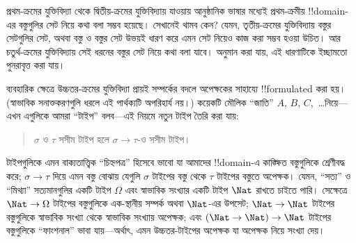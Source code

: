\documentclass[../../../include/open-logic-section]{subfiles}
\begin{document}


প্রথম-ক্রমের যুক্তিবিদ্যা থেকে দ্বিতীয়-ক্রমের যুক্তিবিদ্যায় যাওয়ায়
আনুষ্ঠানিক ভাষার মধ্যেই প্রথম-ক্রমীয় !!{domain}-এর বস্তুগুলির সেট নিয়ে
কথা বলা সম্ভব হয়েছে। সেখানেই থামব কেন? যেমন, তৃতীয়-ক্রমের
যুক্তিবিদ্যায় বস্তুর সেটগুলির সেট, অথবা বস্তু ও বস্তুর সেট উভয়ই ধারণ
করে এমন সেট নিয়েও কাজ করা সম্ভব হওয়া উচিত। আর চতুর্থ-ক্রমের
যুক্তিবিদ্যায় সেই ধরনের বস্তুর সেট নিয়ে কথা বলা যাবে। অনুমান করা যায়,
এই ধারণাটিকে ইচ্ছামতো পুনরাবৃত্ত করা যায়।

ব্যবহারিক ক্ষেত্রে উচ্চতর-ক্রমের যুক্তিবিদ্যা প্রায়ই সম্পর্কের বদলে
অপেক্ষকের সাহায্যে !!{formula}ted করা হয়। (স্বাভাবিক সনাক্তকরণগুলি
ধরলে এই পার্থক্যটি অপরিহার্য নয়।) কয়েকটি মৌলিক “জাতি” $A$, $B$,
$C$,~\dots নিয়ে---এখন এগুলিকে আমরা “টাইপ” বলব---এই নিয়মে নতুন টাইপ
তৈরি করা যায়:
\begin{quote}
$\sigma$ ও $\tau$ সসীম টাইপ হলে $\sigma \to \tau$-ও সসীম টাইপ।
\end{quote}
টাইপগুলিকে এমন বাক্যতাত্ত্বিক “চিহ্নপত্র” হিসেবে ভাবো যা আমাদের
!!{domain}-এ কাঙ্ক্ষিত বস্তুগুলিকে শ্রেণীবদ্ধ করে; $\sigma \to \tau$
দিয়ে এমন বস্তু বোঝায় যেগুলি $\sigma$ টাইপের বস্তু থেকে $\tau$ টাইপের
বস্তুতে অপেক্ষক। যেমন, “সত্য” ও “মিথ্যা” সত্যমানগুলির একটি টাইপ
$\Omega$ এবং স্বাভাবিক সংখ্যার একটি টাইপ $\Nat$ রাখতে চাইতে পারি।
সেক্ষেত্রে $\Nat \to \Omega$ টাইপের বস্তুগুলিকে এক-স্থানীয় সম্পর্ক
অথবা $\Nat$-এর উপসেট; $\Nat \to \Nat$ টাইপের বস্তুগুলিকে স্বাভাবিক
সংখ্যা থেকে স্বাভাবিক সংখ্যায় অপেক্ষক; এবং $(\Nat \to \Nat) \to
\Nat$ টাইপের বস্তুগুলিকে “ফাংশনাল” ভাবা যায়---অর্থাৎ, এমন
উচ্চতর-টাইপের অপেক্ষক যা অপেক্ষক নিয়ে সংখ্যা দেয়।
\end{document}
